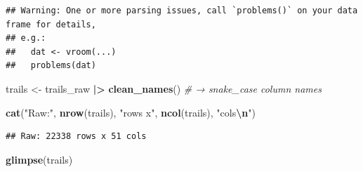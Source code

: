 \documentclass[
]{article}
\newenvironment{Shaded}{\begin{snugshade}}{\end{snugshade}}
\newcommand{\CommentTok}[1]{\textcolor[rgb]{0.56,0.35,0.01}{\textit{#1}}}
\newcommand{\FunctionTok}[1]{\textcolor[rgb]{0.13,0.29,0.53}{\textbf{#1}}}
\newcommand{\NormalTok}[1]{#1}
\newcommand{\OtherTok}[1]{\textcolor[rgb]{0.56,0.35,0.01}{#1}}
\newcommand{\SpecialCharTok}[1]{\textcolor[rgb]{0.81,0.36,0.00}{\textbf{#1}}}
\newcommand{\StringTok}[1]{\textcolor[rgb]{0.31,0.60,0.02}{#1}}
\begin{document}
\begin{verbatim}
## Warning: One or more parsing issues, call `problems()` on your data frame for details,
## e.g.:
##   dat <- vroom(...)
##   problems(dat)
\end{verbatim}

\begin{Shaded}
\begin{Highlighting}[]
\NormalTok{trails     }\OtherTok{\textless{}{-}}\NormalTok{ trails\_raw }\SpecialCharTok{|\textgreater{}} \FunctionTok{clean\_names}\NormalTok{()   }\CommentTok{\# → snake\_case column names}

\FunctionTok{cat}\NormalTok{(}\StringTok{"Raw:"}\NormalTok{, }\FunctionTok{nrow}\NormalTok{(trails), }\StringTok{"rows x"}\NormalTok{, }\FunctionTok{ncol}\NormalTok{(trails), }\StringTok{"cols}\SpecialCharTok{\textbackslash{}n}\StringTok{"}\NormalTok{)}
\end{Highlighting}
\end{Shaded}

\begin{verbatim}
## Raw: 22338 rows x 51 cols
\end{verbatim}

\begin{Shaded}
\begin{Highlighting}[]
\FunctionTok{glimpse}\NormalTok{(trails)}
\end{Highlighting}
\end{Shaded}
\end{document}
